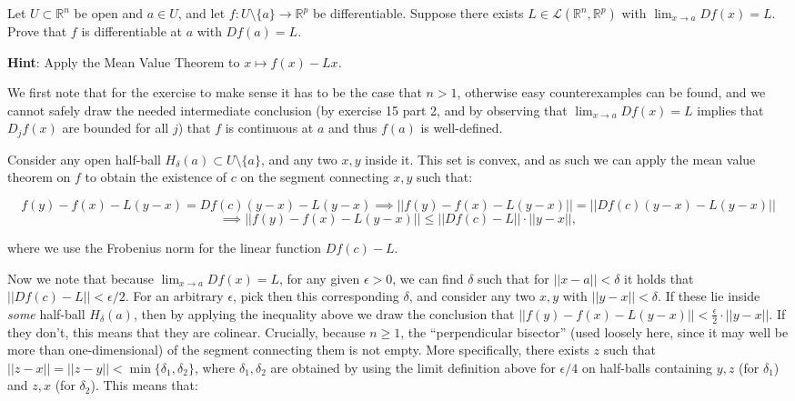 \begin{exercise}{25}
    Let $U \subset \mathbb{R}^n$ be open and $a \in U$, and let $f: U \setminus \{a\} \rightarrow \mathbb{R}^p$ be differentiable.
    Suppose there exists $L \in \mathcal{L}(\mathbb{R}^n, \mathbb{R}^p)$ with $\lim_{x \rightarrow a} Df(x) = L$.
    Prove that $f$ is differentiable at $a$ with $Df(a) = L$.

    \textbf{Hint}: Apply the Mean Value Theorem to $x \mapsto f(x) - Lx$.
\end{exercise}

\begin{solution}

    We first note that for the exercise to make sense it has to be the case that $n > 1$, otherwise easy counterexamples can be found, and we cannot safely draw the needed intermediate conclusion (by exercise 15 part 2, and by observing that $\lim_{x \rightarrow a} Df(x) = L$ implies that $D_jf(x)$ are bounded for all $j$) that $f$ is continuous at $a$ and thus $f(a)$ is well-defined.
    
    Consider any open half-ball $H_{\delta}(a) \subset U \setminus\{a\}$, and any two $x, y$ inside it.
    This set is convex, and as such we can apply the mean value theorem on $f$ to obtain the existence of $c$ on the segment connecting $x, y$ such that:

    $$f(y) - f(x) -L(y - x)= Df(c)(y - x) - L(y - x) \implies \lvert \lvert f(y) - f(x) - L(y - x)\rvert \rvert = \lvert \lvert Df(c)(y - x ) - L(y - x)\rvert \rvert$$
    $$\implies \lvert \lvert f(y) - f(x) - L(y - x)\rvert \rvert \leq \lvert \lvert Df(c) - L \rvert \rvert \cdot \lvert \lvert y - x \rvert \rvert,$$

    where we use the Frobenius norm for the linear function $Df(c) - L$.

    Now we note that because $\lim_{x \rightarrow a} Df(x) = L$, for any given $\epsilon > 0$, we can find $\delta$ such that for $\lvert \lvert x -a \rvert \rvert < \delta$ it holds that $\lvert \lvert Df(c) - L \rvert \rvert < \epsilon/2$.
    For an arbitrary $\epsilon$, pick then this corresponding $\delta$, and consider any two $x, y$ with $\lvert \lvert y - x \rvert \rvert < \delta$.
    If these lie inside \textit{some} half-ball $H_{\delta}(a)$, then by applying the inequality above we draw the conclusion that $\lvert \lvert f(y) - f(x) - L(y - x) \rvert \rvert < \frac{\epsilon}{2} \cdot \lvert \lvert y - x \rvert \rvert$.
    If they don't, this means that they are colinear.
    Crucially, because $n \geq 1$, the ``perpendicular bisector'' (used loosely here, since it may well be more than one-dimensional) of the segment connecting them is not empty.
    More specifically, there exists $z$ such that $\lvert \lvert z - x \rvert \rvert = \lvert \lvert z - y \rvert \rvert < \min\{\delta_1, \delta_2\}$, where $\delta_1, \delta_2$ are obtained by using the limit definition above for $\epsilon/4$ on half-balls containing $y, z$ (for $\delta_1$) and $z, x$ (for $\delta_2$).
    This means that:


\end{solution}

